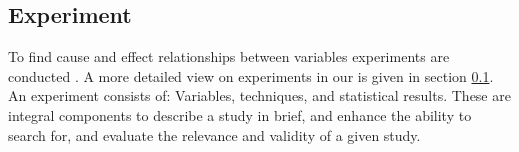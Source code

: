 
\subsection{Experiment}
\label{subsec:experiment}

To find cause and effect relationships between variables experiments are conducted \cite{BuddiesVariables}. A more detailed view on experiments in our \checklist is given in section \ref{subsec:experiment}. An experiment consists of: Variables, techniques, and statistical results. These are integral components to describe a study in brief, and enhance the ability to search for, and evaluate the relevance and validity of a given study.